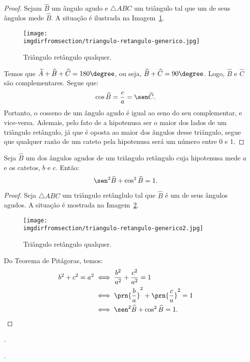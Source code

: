 \begin{proof}
	Sejam $\widehat B$ um ângulo agudo e $\triangle ABC$ um triângulo tal que um de seus ângulos mede $\widehat B$.
	A situação é ilustrada na Imagem~\ref{img:triangulo-retangulo-generico}.
	\begin{figure}[H]
		\centering
		\texttt{[image: \\imgdirfromsection/triangulo-retangulo-generico.jpg]}
		\caption{Triângulo retângulo qualquer.}
		\label{img:triangulo-retangulo-generico}
	\end{figure}
	Temos que $\widehat A + \widehat B  + \widehat C = 180\degree$, ou seja, $\widehat B  + \widehat C = 90\degree$.
	Logo, $\widehat B$ e $\widehat C$ são complementares. Segue que:
	$$\cos \widehat B = \frac c a = \sen \widehat C.$$ Portanto, o cosseno de um ângulo agudo é igual ao seno do seu complementar,
	e vice-versa. Ademais, pelo fato de a hipotenusa ser o maior dos lados de um triângulo retângulo, já que é oposta ao 
	maior dos ângulos desse triângulo, segue que qualquer razão de um cateto pela hipotenusa será um número entre 0 e 1.
\end{proof}

\begin{proposition}
Seja $\widehat B$ um dos ângulos agudos de um triângulo retângulo
cuja hipotenusa mede $a$ e os catetos, $b$ e $c$. Então:
$$\sen^2 \widehat B + \cos^2 \widehat B = 1.$$
\end{proposition}

\begin{proof}
	Seja $\triangle ABC$ um triângulo retânglulo tal que $\widehat B$ é um de seus ângulos agudos. A situação é 
	mostrada na Imagem~\ref{img:prova-relacao-fundamental-trigonometria}.
	\begin{figure}[H]
		\centering
		\texttt{[image: \\imgdirfromsection/triangulo-retangulo-generico2.jpg]}
		\caption{Triângulo retângulo qualquer.}
		\label{img:prova-relacao-fundamental-trigonometria}
	\end{figure}
	Do Teorema de Pitágoras, temos:
	\begin{align*}
		b^2 + c^2 = a^2 &\iff \frac{b^2}{a^2} + \frac{c^2}{a^2} = 1 \\ &\iff \prn{\frac b a}^2 + \prn{\frac c a}^2 = 1 \\ 
		&\iff \sen^2 \widehat B  +  \cos^2 \widehat B= 1.
	\end{align*}
\end{proof}

\begin{onlineact}
	.
\end{onlineact}

\begin{onlineact}
	.
\end{onlineact}